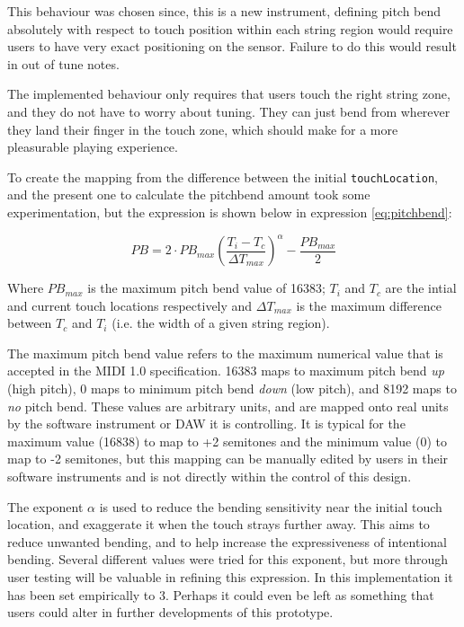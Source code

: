 This behaviour was chosen since, this is a new instrument, defining pitch bend absolutely with respect to touch position within each string region would require users to have very exact positioning on the sensor. Failure to do this would result in out of tune notes. 

The implemented behaviour only requires that users touch the right string zone, and they do not have to worry about tuning. They can just bend from wherever they land their finger in the touch zone, which should make for a more pleasurable playing experience. 

To create the mapping from the difference between the initial \texttt{touchLocation}, and the present one to calculate the pitchbend amount took some experimentation, but the expression is shown below in expression \ref{eq:pitchbend}:

\begin{equation}
    PB = 2 \cdot PB_{max} \left( \frac{T_i-T_c}{\Delta T_{max}} \right)^\alpha - \frac{PB_{max}}{2}
    \label{eq:pitchbend}
\end{equation}

Where $PB_{max}$ is the maximum pitch bend value of 16383; $T_i$ and $T_c$ are the intial and current touch locations respectively and $\Delta T_{max}$ is the maximum difference between $T_c$ and $T_i$ (i.e. the width of a given string region).

The maximum pitch bend value refers to the maximum numerical value that is accepted in the MIDI 1.0 specification. 16383 maps to maximum pitch bend \textit{up} (high pitch), 0 maps to minimum pitch bend \textit{down} (low pitch), and 8192 maps to \textit{no} pitch bend. These values are arbitrary units, and are mapped onto real units by the software instrument or DAW it is controlling. It is typical for the maximum value (16838) to map to +2 semitones and the minimum value (0) to map to -2 semitones, but this mapping can be manually edited by users in their software instruments and is not directly within the control of this design. 

The exponent $\alpha$ is used to reduce the bending sensitivity near the initial touch location, and exaggerate it when the touch strays further away. This aims to reduce unwanted bending, and to help increase the expressiveness of intentional bending. Several different values were tried for this exponent, but more through user testing will be valuable in refining this expression. In this implementation it has been set empirically to 3. Perhaps it could even be left as something that users could alter in further developments of this prototype. 

